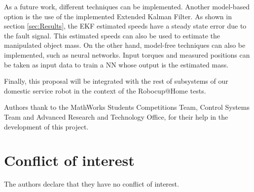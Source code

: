 \documentclass[smallextended]{svjour3}       %
\begin{document}
As a future work, different techniques can be implemented. Another model-based option is the use of the implemented Extended Kalman Filter. As shown in section \ref{sec:Results}, the EKF estimated speeds have a steady state error due to the fault signal. This estimated speeds can also be used to estimate the manipulated object mass. On the other hand, model-free techniques can also be implemented, such as neural networks. Input torques and measured positions can be taken as input data to train a NN whose output is the estimated mass.

Finally, this proposal will be integrated with the rest of subsystems of our domestic service robot in the context of the Robocup@Home tests. 

\begin{acknowledgements}
Authors thank to the MathWorks Students Competitions Team, Control Systems Team and Advanced Research and Technology Office, for their help in the development of this project.
\end{acknowledgements}


%
 \section*{Conflict of interest}
 The authors declare that they have no conflict of interest.



\end{document}
